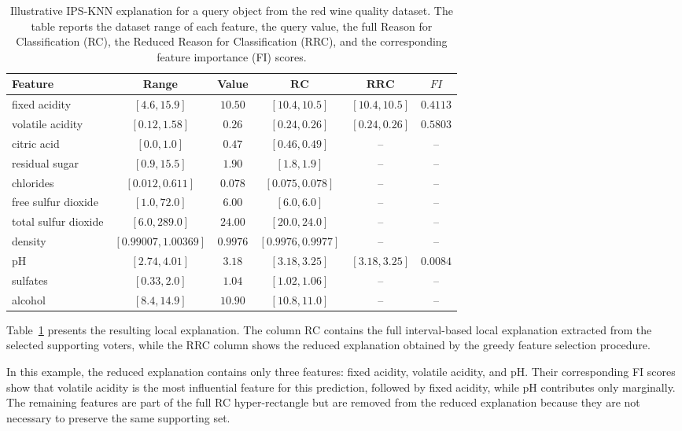 \documentclass[a4paper,fleqn]{cas-sc}
\begin{document}
\begin{table}[H]
\caption{Illustrative IPS-KNN explanation for a query object from the red wine quality dataset. The table reports the dataset range of each feature, the query value, the full Reason for Classification (RC), the Reduced Reason for Classification (RRC), and the corresponding feature importance (FI) scores.}


\begin{tabular}{lccccc}
\toprule
Feature & Range & Value & $\mathbf{RC}$ & $\mathbf{RRC}$ & $FI$ \\
\midrule
fixed acidity & $[4.6, 15.9]$ & $10.50$ & $[10.4, 10.5]$ & $[10.4, 10.5]$ & $0.4113$ \\
volatile acidity & $[0.12, 1.58]$ & $0.26$ & $[0.24, 0.26]$ & $[0.24, 0.26]$ & $0.5803$ \\
citric acid & $[0.0, 1.0]$ & $0.47$ & $[0.46, 0.49]$ & -- & -- \\
residual sugar & $[0.9, 15.5]$ & $1.90$ & $[1.8, 1.9]$ & -- & -- \\
chlorides & $[0.012, 0.611]$ & $0.078$ & $[0.075, 0.078]$ & -- & -- \\
free sulfur dioxide & $[1.0, 72.0]$ & $6.00$ & $[6.0, 6.0]$ & -- & -- \\
total sulfur dioxide & $[6.0, 289.0]$ & $24.00$ & $[20.0, 24.0]$ & -- & -- \\
density & $[0.99007, 1.00369]$ & $0.9976$ & $[0.9976, 0.9977]$ & -- & -- \\
pH & $[2.74, 4.01]$ & $3.18$ & $[3.18, 3.25]$ & $[3.18, 3.25]$ & $0.0084$ \\
sulfates & $[0.33, 2.0]$ & $1.04$ & $[1.02, 1.06]$ & -- & -- \\
alcohol & $[8.4, 14.9]$ & $10.90$ & $[10.8, 11.0]$ & -- & -- \\
\bottomrule
\end{tabular}
\label{tab:wine_example}
\end{table}



Table~\ref{tab:wine_example} presents the resulting local explanation. The column RC contains the full interval-based local explanation extracted from the selected supporting voters, while the RRC column shows the reduced explanation obtained by the greedy feature selection procedure.

In this example, the reduced explanation contains only three features: fixed acidity, volatile acidity, and pH. Their corresponding FI scores show that volatile acidity is the most influential feature for this prediction, followed by fixed acidity, while pH contributes only marginally. The remaining features are part of the full RC hyper-rectangle but are removed from the reduced explanation because they are not necessary to preserve the same supporting set.
\end{document}
